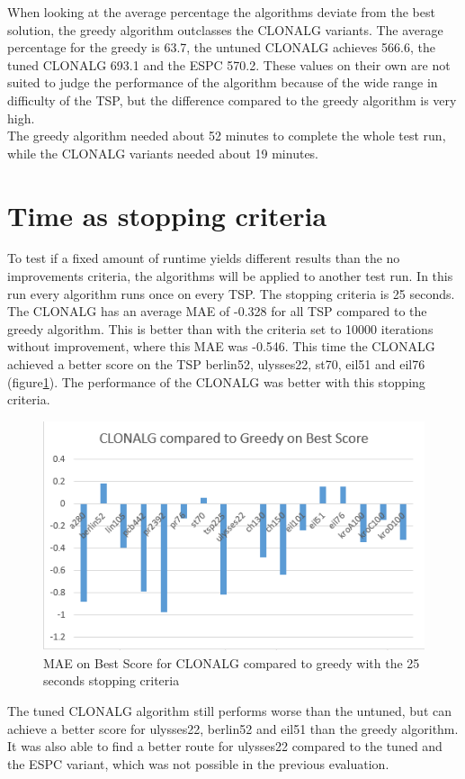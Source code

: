 When looking at the average percentage the algorithms deviate from the best solution, the greedy algorithm outclasses the CLONALG variants. The average percentage for the greedy is 63.7, the untuned CLONALG achieves 566.6, the tuned CLONALG 693.1 and the ESPC 570.2. These values on their own are not suited to judge the performance of the algorithm because of the wide range in difficulty of the TSP, but the difference compared to the greedy algorithm is very high.\\ The greedy algorithm needed about 52 minutes to complete the whole test run, while the CLONALG variants needed about 19 minutes.
\section{Time as stopping criteria}
To test if a fixed amount of runtime yields different results than the no improvements criteria, the algorithms will be applied to another test run. In this run every algorithm runs once on every TSP. The stopping criteria is 25 seconds.\\
The CLONALG has an average MAE of -0.328 for all TSP compared to the greedy algorithm. This is better than with the criteria set to 10000 iterations without improvement, where this MAE was -0.546. This time the CLONALG achieved a better score on the TSP berlin52, ulysses22, st70, eil51 and eil76 (figure\ref{CLONALG_Time}). The performance of the CLONALG was better with this stopping criteria.
\begin{figure}[H]
	\includegraphics[]{Images/CLONALG_Time.png}
	\caption{MAE on Best Score for CLONALG compared to greedy with the 25 seconds stopping criteria}
	\label{CLONALG_Time}
\end{figure}
The tuned CLONALG algorithm still performs worse than the untuned, but can achieve a better score for ulysses22, berlin52 and eil51 than the greedy algorithm. It was also able to find a better route for ulysses22 compared to the tuned and the ESPC variant, which was not possible in the previous evaluation.\\

